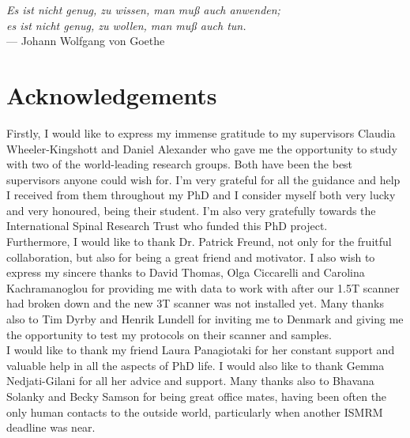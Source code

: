 

\begin{flushright}{\slshape    
Es ist nicht genug, zu wissen, man muß auch anwenden;\\
es ist nicht genug, zu wollen, man muß auch tun.
} \\ \medskip
--- Johann Wolfgang von Goethe
\end{flushright}

\bigskip


\begingroup

\let\clearpage\relax
\let\cleardoublepage\relax
\let\cleardoublepage\relax

\chapter*{Acknowledgements} %

\noindent 
Firstly, I would like to express my immense gratitude to my supervisors Claudia Wheeler-Kingshott and Daniel Alexander who gave me the opportunity to study with two of the world-leading research groups. Both have been the best supervisors anyone could wish for. I'm very grateful for all the guidance and help I received from them throughout my PhD and I consider myself both very lucky and very honoured, being their student. I'm also very gratefully towards the International Spinal Research Trust who funded this PhD project.\\

\noindent 
Furthermore, I would like to thank Dr. Patrick Freund, not only for the fruitful collaboration, but also for being a great friend and motivator. I also wish to express my sincere thanks to  David Thomas,  Olga Ciccarelli and Carolina Kachramanoglou for providing me with data to work with after our 1.5T scanner had broken down and the new 3T scanner was not installed yet. Many thanks also to Tim Dyrby and Henrik Lundell for inviting me to Denmark and giving me the opportunity to test my protocols on their scanner and samples.\\

\noindent
I would like to thank my friend Laura Panagiotaki for her constant support and valuable help in all the aspects of PhD life. I would also like to thank Gemma Nedjati-Gilani for all her advice and support.
Many thanks also to Bhavana Solanky and Becky Samson for being great office mates, having been often the only human contacts to the outside world, particularly when another ISMRM deadline was near. \\

